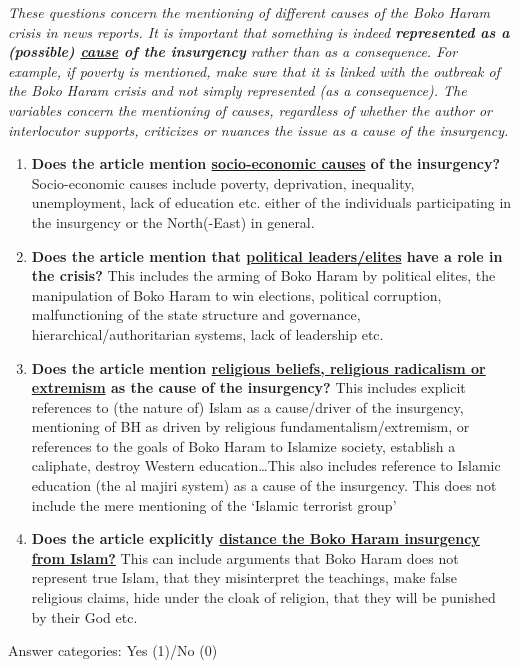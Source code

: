 \textit{These questions concern the mentioning of different causes of the Boko Haram crisis in news reports. It is important that something is indeed \textbf{represented as a (possible) \underline{cause} of the insurgency} rather than as a consequence. For example, if poverty is mentioned, make sure that it is linked with the outbreak of the Boko Haram crisis and not simply represented (as a consequence). The variables concern the mentioning of causes, regardless of whether the author or interlocutor supports, criticizes or nuances the issue as a cause of the insurgency.
}

\begin{enumerate}[noitemsep,font=\bfseries]
   \item \textbf{Does the article mention \underline{socio-economic causes} of the insurgency?} Socio-economic causes include poverty, deprivation, inequality, unemployment, lack of education etc. either of the individuals participating in the insurgency or the North(-East) in general.
    \item \textbf{Does the article mention that \underline{political leaders/elites} have a role in the crisis?} This includes the arming of Boko Haram by political elites, the manipulation of Boko Haram to win elections, political corruption, malfunctioning of the state structure and governance, hierarchical/authoritarian systems, lack of leadership etc.
    \item \textbf{Does the article mention \underline{religious beliefs, religious radicalism or extremism} as the cause of the insurgency?} This includes explicit references to (the nature of) Islam as a cause/driver of the insurgency, mentioning of BH as driven by religious fundamentalism/extremism, or references to the goals of Boko Haram to Islamize society, establish a caliphate, destroy Western education\dots This also includes reference to Islamic education (the al majiri system) as a cause of the insurgency. This does not include the mere mentioning of the ‘Islamic terrorist group’
    \item \textbf{Does the article explicitly \underline{distance the Boko Haram insurgency from Islam?}} This can include arguments that Boko Haram does not represent true Islam, that they misinterpret the teachings, make false religious claims, hide under the cloak of religion, that they will be punished by their God etc.
\end{enumerate}

\noindent Answer categories: Yes (1)/No (0)

